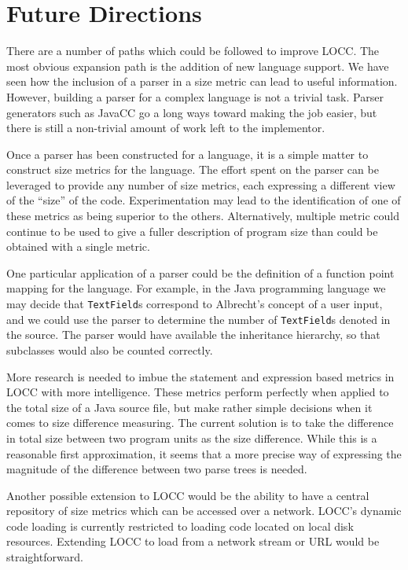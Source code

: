 
\chapter{Future Directions}
\label{chap:future}

There are a number of paths which could be followed to improve LOCC.  The
most obvious expansion path is the addition of new language support.  We
have seen how the inclusion of a parser in a size metric can lead to useful 
information.  However, building a parser for a complex language is not a
trivial task.  Parser generators such as JavaCC go a long
ways toward making the job easier, but there is still a non-trivial amount
of work left to the implementor.

Once a parser has been constructed for a language, it is a simple matter to 
construct size metrics for the language.  The effort spent on the parser
can be leveraged to provide any number of size metrics, each expressing a
different view of the ``size'' of the code.  Experimentation may lead to
the identification of one of these metrics as being superior to the
others.  Alternatively, multiple metric could continue to be used to give a 
fuller description of program size than could be obtained with a single
metric.

One particular application of a parser could be the definition of a
function point mapping for the language.  For example, in the Java
programming language we may decide that {\tt TextField\/}s correspond to
Albrecht's concept of a user input, and we could use the parser to
determine the number of {\tt TextField\/}s denoted in the source.  The
parser would have available the inheritance hierarchy, so that subclasses
would also be counted correctly.

More research is needed to imbue the statement and expression based metrics 
in LOCC with more intelligence.  These metrics perform perfectly when
applied to the total size of a Java source file, but make rather simple
decisions when it comes to size difference measuring.  The current solution 
is to take the difference in total size between two program units as the
size difference.  While this is a reasonable first approximation, it seems
that a more precise way of expressing the magnitude of the difference
between two parse trees is needed.

Another possible extension to LOCC would be the ability to have a central
repository of size metrics which can be accessed over a network.  LOCC's
dynamic code loading is currently restricted to loading code located on
local disk resources.  Extending LOCC to load from a network stream or URL
would be straightforward.
